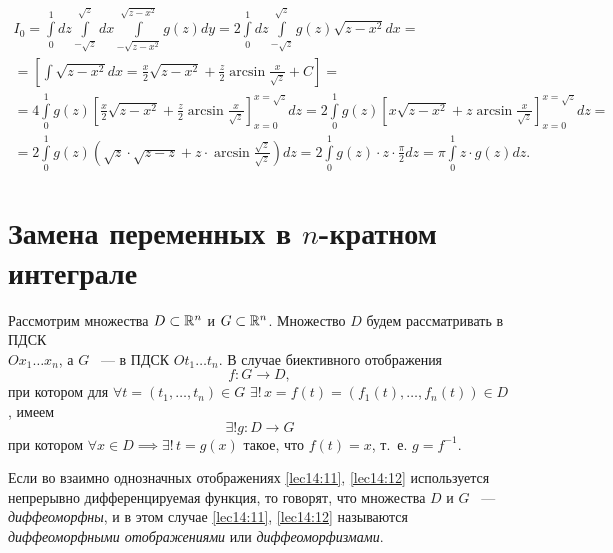 \documentclass[../../main.tex]{subfiles}
\begin{document}
\begin{example}
		\[
		\begin{gathered}
		I_0 = 
		\int\limits_0^1dz\int\limits_{-\sqrt{z}}^{\sqrt{z}}dx\int\limits_{-\sqrt{z - 
		x^2}}^{\sqrt{z - x^2}}g\left(z\right)dy = 
		2\int\limits_0^1dz\int\limits_{-\sqrt{z}}^{\sqrt{z}}g\left(z\right)\sqrt{z - 
		x^2}dx = \\ =
		\left[\int\sqrt{z - x^2}dx = \frac{x}{2}\sqrt{z - x^2} + 
		\frac{z}{2}\arcsin{\frac{x}{\sqrt{z}}} + C\right] = \\ = 
		4 \int\limits_0^1 g\left(z\right) \left[ \frac{x}{2}\sqrt{z - x^2} + 
		\frac{z}{2}\arcsin{\frac{x}{\sqrt{z}}}\right]_{x=0}^{x=\sqrt{z}}dz= 2 
		\int\limits_0^1 g\left(z\right) \left[x\sqrt{z - x^2} + 
		z\arcsin{\frac{x}{\sqrt{z}}}\right]_{x=0}^{x=\sqrt{z}}dz = \\
		= 2 \int\limits_0^1 g\left(z\right) \left(\sqrt{z} \cdot \sqrt{z-z} + 
		z \cdot \arcsin{\frac{\sqrt{z}}{\sqrt{z}}}\right) dz = 2 \int\limits_0^1 
		g\left(z\right) \cdot z \cdot \frac{\pi}{2} dz = \pi \int\limits_0^1 z \cdot 
		g\left(z\right)dz. 
		\end{gathered}\]
	\end{example}

	\section{Замена переменных в $n$-кратном интеграле}
	
	Рассмотрим множества $D \subset \mathbb{R}^n$ и $G \subset \mathbb{R}^n$. Множество $D$ будем 
	рассматривать в ПДСК\\ $Ox_1 \ldots x_n$, а $G$ ~--- в ПДСК $Ot_1 \ldots t_n$.
	В случае биективного отображения
	\begin{equation}
	\label{lec14:11}
	f : G \to D,
	\end{equation} при котором 
	для $\forall t = \left( t_1, \ldots, t_n \right) \in G$ $\exists ! \,
	x = f\left(t\right) = \left(f_1\left( t\right) , \ldots, f_n\left( t\right)  
	\right)  \in D$, имеем
	\begin{equation}
	\label{lec14:12}
	\exists ! g :  D \to G
	\end{equation}
	при котором $\forall x \in D \implies  \exists!\, t = g\left( x\right) $ 
	такое, что 
	$f\left( t\right)  = x$, т.~е. $g = f^{-1}$.
	
	Если во взаимно однозначных отображениях \eqref{lec14:11}, \eqref{lec14:12}
	используется непрерывно дифференцируемая функция, то говорят, что множества 
	$D$ и $G$ ~--- \emph{диффеоморфны}, и в этом случае 
	\eqref{lec14:11}, \eqref{lec14:12} называются \emph{диффеоморфными 
	отображениями}
	или \emph{диффеоморфизмами}.
	
\end{document}
